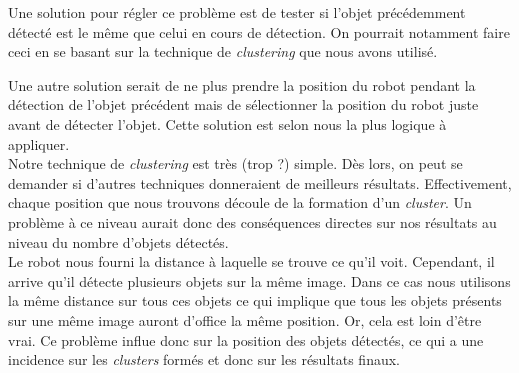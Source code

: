 \documentclass[10pt,a4paper]{article}
\begin{document}
		Une solution pour régler ce problème est de tester si l'objet précédemment détecté est le même que celui en cours de détection. On pourrait notamment faire ceci en se basant sur la technique de \textit{clustering} que nous avons utilisé.
		
		Une autre solution serait de ne plus prendre la position du robot pendant la détection de l'objet précédent mais de sélectionner la position du robot juste avant de détecter l'objet. Cette solution est selon nous la plus logique à appliquer.\\

		Notre technique de \textit{clustering} est très (trop ?) simple. Dès lors, on peut se demander si d'autres techniques donneraient de meilleurs résultats. Effectivement, chaque position que nous trouvons découle de la formation d'un \textit{cluster}. Un problème à ce niveau aurait donc des conséquences directes sur nos résultats au niveau du nombre d'objets détectés.\\

   		Le robot nous fourni la distance à laquelle se trouve ce qu'il voit. Cependant, il arrive qu'il détecte plusieurs objets sur la même image. Dans ce cas nous utilisons la même distance sur tous ces objets ce qui implique que tous les objets présents sur une même image auront d'office la même position. Or, cela est loin d'être vrai. Ce problème influe donc sur la position des objets détectés, ce qui a une incidence sur les \textit{clusters} formés et donc sur les résultats finaux.
   
          	
\end{document}
